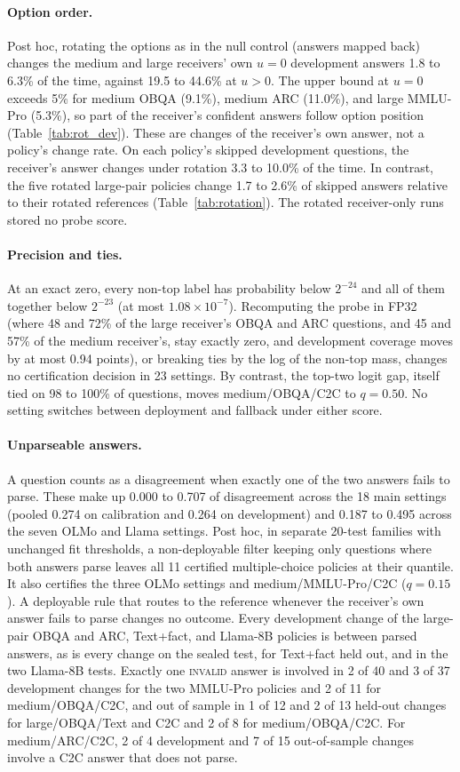 \paragraph{Option order.} Post hoc, rotating the options as in the null control (answers mapped back) changes the medium and large receivers' own $u=0$ development answers 1.8 to 6.3\% of the time, against 19.5 to 44.6\% at $u>0$. The upper bound at $u=0$ exceeds 5\% for medium OBQA (9.1\%), medium ARC (11.0\%), and large MMLU-Pro (5.3\%), so part of the receiver's confident answers follow option position (Table~\ref{tab:rot_dev}). These are changes of the receiver's own answer, not a policy's change rate. On each policy's skipped development questions, the receiver's answer changes under rotation 3.3 to 10.0\% of the time. In contrast, the five rotated large-pair policies change 1.7 to 2.6\% of skipped answers relative to their rotated references (Table~\ref{tab:rotation}). The rotated receiver-only runs stored no probe score.

\paragraph{Precision and ties.} At an exact zero, every non-top label has probability below $2^{-24}$ and all of them together below $2^{-23}$ (at most $1.08\times10^{-7}$). Recomputing the probe in FP32 (where 48 and 72\% of the large receiver's OBQA and ARC questions, and 45 and 57\% of the medium receiver's, stay exactly zero, and development coverage moves by at most 0.94 points), or breaking ties by the log of the non-top mass, changes no certification decision in 23 settings. By contrast, the top-two logit gap, itself tied on 98 to 100\% of questions, moves medium/OBQA/C2C to $q=0.50$. No setting switches between deployment and fallback under either score.

\paragraph{Unparseable answers.} A question counts as a disagreement when exactly one of the two answers fails to parse. These make up 0.000 to 0.707 of disagreement across the 18 main settings (pooled 0.274 on calibration and 0.264 on development) and 0.187 to 0.495 across the seven OLMo and Llama settings. Post hoc, in separate 20-test families with unchanged fit thresholds, a non-deployable filter keeping only questions where both answers parse leaves all 11 certified multiple-choice policies at their quantile. It also certifies the three OLMo settings and medium/MMLU-Pro/C2C ($q=0.15$). A deployable rule that routes to the reference whenever the receiver's own answer fails to parse changes no outcome. Every development change of the large-pair OBQA and ARC, Text+fact, and Llama-8B policies is between parsed answers, as is every change on the sealed test, for Text+fact held out, and in the two Llama-8B tests. Exactly one \textsc{invalid} answer is involved in 2 of 40 and 3 of 37 development changes for the two MMLU-Pro policies and 2 of 11 for medium/OBQA/C2C, and out of sample in 1 of 12 and 2 of 13 held-out changes for large/OBQA/Text and C2C and 2 of 8 for medium/OBQA/C2C. For medium/ARC/C2C, 2 of 4 development and 7 of 15 out-of-sample changes involve a C2C answer that does not parse.
